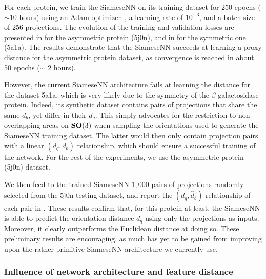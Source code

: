 For each protein, we train the SiameseNN on its training dataset for 250 epochs ($\sim$10 hours) using an Adam optimizer~\cite{kingma2014adam}, a learning rate of $10^{-3}$, and a batch size of 256 projections.
The evolution of the training and validation losses are presented in  for the asymmetric protein (5j0n), and in  for the symmetric one (5a1a).
The results demonstrate that the SiameseNN succeeds at learning a proxy distance for the asymmetric protein dataset, as convergence is reached in about 50 epochs ($\sim$ 2 hours).

However, the current SiameseNN architecture fails at learning the distance for the dataset 5a1a, which is very likely due to the symmetry of the $\beta$-galactosidase protein.
Indeed, its synthetic dataset contains pairs of projections that share the same $d_b$, yet differ in their $d_q$.
This simply advocates for the restriction to non-overlapping areas on $\mathrm{\mathbf{SO}}(3)$ when sampling the orientations used to generate the SiameseNN training dataset.
The latter would then only contain projection pairs with a linear $(d_q,d_b)$ relationship, which should ensure a successful training of the network.
For the rest of the experiments, we use the asymmetric protein (5j0n) dataset.

We then feed to the trained SiameseNN $1,000$ pairs of projections randomly selected from the 5j0n testing dataset, and report the $(d_q,\widehat{d}_b)$ relationship of each pair in .
These results confirm that, for this protein at least, the SiameseNN is able to predict the orientation distance $d_q$ using only the projections as inputs.
Moreover, it clearly outperforms the Euclidean distance at doing so.
These preliminary results are encouraging, as much has yet to be gained from improving upon the rather primitive SiameseNN architecture we currently use.

\subsubsection{Influence of network architecture and feature distance}



